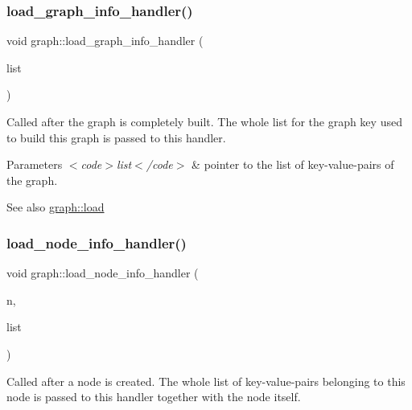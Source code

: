 \subsubsection{\texorpdfstring{load\+\_\+graph\+\_\+info\+\_\+handler()}{load\_graph\_info\_handler()}}
{\footnotesize\ttfamily void graph\+::load\+\_\+graph\+\_\+info\+\_\+handler (\begin{DoxyParamCaption}\item[{\mbox{\hyperlink{struct_k_m_l__pair}{K\+M\+L\+\_\+pair}} $\ast$}]{list }\end{DoxyParamCaption})\hspace{0.3cm}{\ttfamily [virtual]}}

Called after the graph is completely built. The whole list for the graph key used to build this graph is passed to this handler.


\begin{DoxyParams}{Parameters}
{\em $<$code$>$list$<$/code$>$} & pointer to the list of key-\/value-\/pairs of the graph. \\
\hline
\end{DoxyParams}
\begin{DoxySeeAlso}{See also}
\mbox{\hyperlink{classgraph_a35749ff66d1acd6bbef9852df4f39c95}{graph\+::load}} 
\end{DoxySeeAlso}
\mbox{\label{classgraph_a1844866137c51123b05f21be60e1e165}} 
\subsubsection{\texorpdfstring{load\+\_\+node\+\_\+info\+\_\+handler()}{load\_node\_info\_handler()}}
{\footnotesize\ttfamily void graph\+::load\+\_\+node\+\_\+info\+\_\+handler (\begin{DoxyParamCaption}\item[{\mbox{\hyperlink{classnode}{node}}}]{n,  }\item[{\mbox{\hyperlink{struct_k_m_l__pair}{K\+M\+L\+\_\+pair}} $\ast$}]{list }\end{DoxyParamCaption})\hspace{0.3cm}{\ttfamily [virtual]}}

Called after a node is created. The whole list of key-\/value-\/pairs belonging to this node is passed to this handler together with the node itself.


